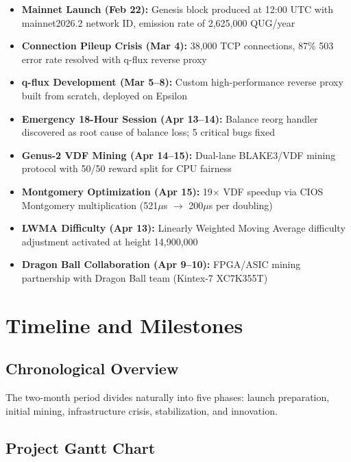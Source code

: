 \documentclass[12pt,a4paper]{article}
\begin{document}
\begin{itemize}
    \item \textbf{Mainnet Launch (Feb 22):} Genesis block produced at 12:00 UTC with mainnet2026.2 network ID, emission rate of 2{,}625{,}000 QUG/year
    \item \textbf{Connection Pileup Crisis (Mar 4):} 38{,}000 TCP connections, 87\% 503 error rate resolved with q-flux reverse proxy
    \item \textbf{q-flux Development (Mar 5--8):} Custom high-performance reverse proxy built from scratch, deployed on Epsilon
    \item \textbf{Emergency 18-Hour Session (Apr 13--14):} Balance reorg handler discovered as root cause of balance loss; 5 critical bugs fixed
    \item \textbf{Genus-2 VDF Mining (Apr 14--15):} Dual-lane BLAKE3/VDF mining protocol with 50/50 reward split for CPU fairness
    \item \textbf{Montgomery Optimization (Apr 15):} 19$\times$ VDF speedup via CIOS Montgomery multiplication (521$\mu$s $\to$ 200$\mu$s per doubling)
    \item \textbf{LWMA Difficulty (Apr 13):} Linearly Weighted Moving Average difficulty adjustment activated at height 14{,}900{,}000
    \item \textbf{Dragon Ball Collaboration (Apr 9--10):} FPGA/ASIC mining partnership with Dragon Ball team (Kintex-7 XC7K355T)
\end{itemize}

\section{Timeline and Milestones}

\subsection{Chronological Overview}

The two-month period divides naturally into five phases: launch preparation, initial mining, infrastructure crisis, stabilization, and innovation.

\subsection{Project Gantt Chart}
\end{document}
